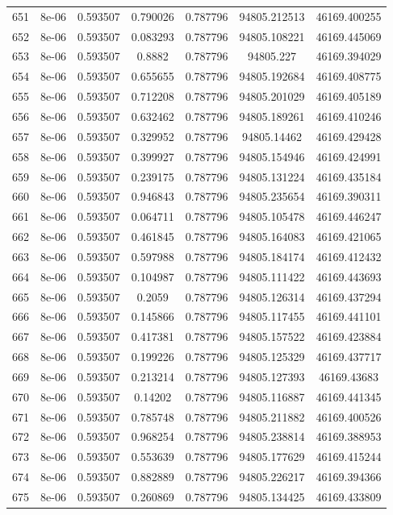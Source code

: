 \begin{table}
\begin{tabular*}{\linewidth}{c|c|c|c|c|c|c}
651 & 8e-06 & 0.593507 & 0.790026 & 0.787796 & 94805.212513 & 46169.400255\\
652 & 8e-06 & 0.593507 & 0.083293 & 0.787796 & 94805.108221 & 46169.445069\\
653 & 8e-06 & 0.593507 & 0.8882 & 0.787796 & 94805.227 & 46169.394029\\
654 & 8e-06 & 0.593507 & 0.655655 & 0.787796 & 94805.192684 & 46169.408775\\
655 & 8e-06 & 0.593507 & 0.712208 & 0.787796 & 94805.201029 & 46169.405189\\
656 & 8e-06 & 0.593507 & 0.632462 & 0.787796 & 94805.189261 & 46169.410246\\
657 & 8e-06 & 0.593507 & 0.329952 & 0.787796 & 94805.14462 & 46169.429428\\
658 & 8e-06 & 0.593507 & 0.399927 & 0.787796 & 94805.154946 & 46169.424991\\
659 & 8e-06 & 0.593507 & 0.239175 & 0.787796 & 94805.131224 & 46169.435184\\
660 & 8e-06 & 0.593507 & 0.946843 & 0.787796 & 94805.235654 & 46169.390311\\
661 & 8e-06 & 0.593507 & 0.064711 & 0.787796 & 94805.105478 & 46169.446247\\
662 & 8e-06 & 0.593507 & 0.461845 & 0.787796 & 94805.164083 & 46169.421065\\
663 & 8e-06 & 0.593507 & 0.597988 & 0.787796 & 94805.184174 & 46169.412432\\
664 & 8e-06 & 0.593507 & 0.104987 & 0.787796 & 94805.111422 & 46169.443693\\
665 & 8e-06 & 0.593507 & 0.2059 & 0.787796 & 94805.126314 & 46169.437294\\
666 & 8e-06 & 0.593507 & 0.145866 & 0.787796 & 94805.117455 & 46169.441101\\
667 & 8e-06 & 0.593507 & 0.417381 & 0.787796 & 94805.157522 & 46169.423884\\
668 & 8e-06 & 0.593507 & 0.199226 & 0.787796 & 94805.125329 & 46169.437717\\
669 & 8e-06 & 0.593507 & 0.213214 & 0.787796 & 94805.127393 & 46169.43683\\
670 & 8e-06 & 0.593507 & 0.14202 & 0.787796 & 94805.116887 & 46169.441345\\
671 & 8e-06 & 0.593507 & 0.785748 & 0.787796 & 94805.211882 & 46169.400526\\
672 & 8e-06 & 0.593507 & 0.968254 & 0.787796 & 94805.238814 & 46169.388953\\
673 & 8e-06 & 0.593507 & 0.553639 & 0.787796 & 94805.177629 & 46169.415244\\
674 & 8e-06 & 0.593507 & 0.882889 & 0.787796 & 94805.226217 & 46169.394366\\
675 & 8e-06 & 0.593507 & 0.260869 & 0.787796 & 94805.134425 & 46169.433809\\
\end{tabular*}
\end{table}
